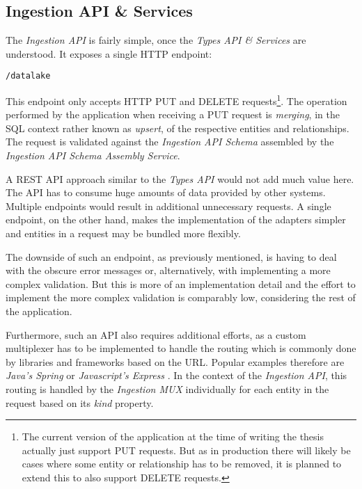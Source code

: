 \subsection{Ingestion API \& Services}
The \emph{Ingestion API} is fairly simple, once the \emph{Types API \& Services} are understood. It exposes a single HTTP endpoint:\\

\begin{lstlisting}[caption=Ingestion API Endpoint, captionpos=b, label=lst:IngestionEndpoint]
/datalake
\end{lstlisting}

This endpoint only accepts HTTP PUT and DELETE requests\footnote{The current version of the application at the time of writing the thesis actually just support PUT requests. But as in production there will likely be cases where some entity or relationship has to be removed, it is planned to extend this to also support DELETE requests.}. The operation performed by the application when receiving a PUT request is \emph{merging}, in the SQL context rather known as \emph{upsert}, of the respective entities and relationships. The request is validated against the \emph{Ingestion API Schema} assembled by the \emph{Ingestion API Schema Assembly Service}.\par 
A REST API approach similar to the \emph{Types API} would not add much value here. The API has to consume huge amounts of data provided by other systems. Multiple endpoints would result in additional unnecessary requests. A single endpoint, on the other hand, makes the implementation of the adapters simpler and entities in a request may be bundled more flexibly.\par
The downside of such an endpoint, as previously mentioned, is having to deal with the obscure error messages or, alternatively, with implementing a more complex validation. But this is more of an implementation detail and the effort to implement the more complex validation is comparably low, considering the rest of the application.\par
Furthermore, such an API also requires additional efforts, as a custom multiplexer has to be implemented to handle the routing which is commonly done by libraries and frameworks based on the URL. Popular examples therefore are \emph{Java's Spring} \cite{Spring} or \emph{Javascript's Express} \cite{Express}. In the context of the \emph{Ingestion API}, this routing is handled by the \emph{Ingestion MUX} individually for each entity in the request based on its \emph{kind} property. 

